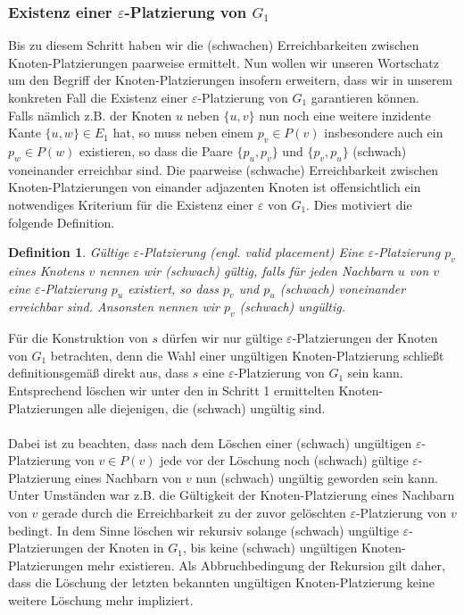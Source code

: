 \documentclass[a4paper, 12pt, twoside]{article}
\theoremstyle{Format1} %
\newtheorem{Def}{Definition}[section]       %
\begin{document}
\subsubsection{Existenz einer $\varepsilon$-Platzierung von $G_1$}
Bis zu diesem Schritt haben wir die (schwachen) Erreichbarkeiten zwischen Knoten-Platzierungen paarweise ermittelt.
Nun wollen wir unseren Wortschatz um den Begriff der Knoten-Platzierungen insofern erweitern, dass wir in unserem konkreten Fall die Existenz einer
$\varepsilon$-Platzierung von $G_1$ garantieren können.
\\
Falls nämlich z.B. der Knoten $u$ neben $\{u,v\}$ nun noch eine weitere inzidente Kante $\{u,w\} \in E_1$ hat, so muss neben einem $p_v \in P(v)$ insbesondere auch
ein $p_w \in P(w)$ existieren, so dass die Paare $\{p_u,p_v\}$ und $\{p_v,p_u\}$ (schwach) voneinander erreichbar sind. Die paarweise (schwache) Erreichbarkeit
zwischen Knoten-Platzierungen von einander adjazenten Knoten ist offensichtlich ein notwendiges Kriterium für die Existenz einer $\varepsilon$ von $G_1$.
Dies motiviert die folgende Definition.
\begin{Def}
	Gültige $\varepsilon$-Platzierung (engl. valid placement)
	Eine $\varepsilon$-Platzierung $p_v$ eines Knotens $v$ nennen wir (schwach) gültig, falls für jeden Nachbarn $u$ von $v$
	eine $\varepsilon$-Platzierung $p_u$ existiert, so dass $p_v$ und $p_u$ (schwach) voneinander erreichbar sind.
	Ansonsten nennen wir $p_v$ (schwach) ungültig.
\end{Def}

Für die Konstruktion von $s$ dürfen wir nur gültige $\varepsilon$-Platzierungen der Knoten von $G_1$ betrachten, denn die
Wahl einer ungültigen Knoten-Platzierung schließt definitionsgemäß direkt aus, dass $s$ eine $\varepsilon$-Platzierung von $G_1$ sein kann.
Entsprechend löschen wir unter den in Schritt 1 ermittelten Knoten-Platzierungen alle diejenigen, die (schwach) ungültig sind.
\\
\\
Dabei ist zu beachten, dass nach dem Löschen einer (schwach) ungültigen $\varepsilon$-Platzierung von $v \in P(v)$
jede vor der Löschung noch (schwach) gültige $\varepsilon$-Platzierung eines Nachbarn von $v$ nun (schwach) ungültig geworden sein kann.
Unter Umständen war z.B. die Gültigkeit der Knoten-Platzierung eines Nachbarn von $v$ gerade durch die Erreichbarkeit zu der zuvor gelöschten
$\varepsilon$-Platzierung von $v$ bedingt.
In dem Sinne löschen wir rekursiv solange (schwach) ungültige $\varepsilon$-Platzierungen der Knoten in $G_1$, bis
keine (schwach) ungültigen Knoten-Platzierungen mehr existieren. Als Abbruchbedingung der Rekursion gilt daher, dass die Löschung der letzten bekannten
ungültigen Knoten-Platzierung keine weitere Löschung mehr impliziert.
\end{document}
